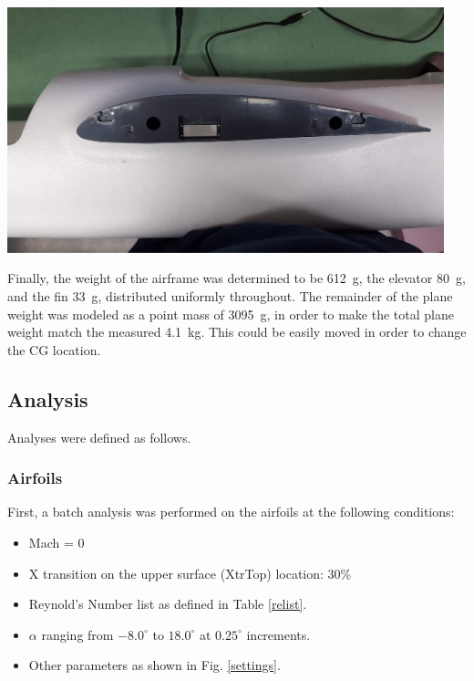 \documentclass[]{auvsi_doc}
\begin{document}
\begin{center}
	\includegraphics[width=0.95\textwidth]{./airfoils.png}
	\label{airfoil}
\end{center}

Finally, the weight of the airframe was determined to be 612~g, the elevator 80~g, and the fin 33~g, distributed uniformly throughout. The remainder of the plane weight was modeled as a point mass of 3095~g, in order to make the total plane weight match the measured 4.1~kg. This could be easily moved in order to change the CG location.

\subsection{Analysis}

Analyses were defined as follows.

\subsubsection{Airfoils}
First, a batch analysis was performed on the airfoils at the following conditions:
\begin{itemize}
	\item Mach = 0
	\item X transition on the upper surface (XtrTop) location: 30\%
	\item Reynold's Number list as defined in Table \ref{relist}.
	\item $\alpha$ ranging from $-8.0^\circ$ to $18.0^\circ$ at $0.25^\circ$ increments.
	\item Other parameters as shown in Fig. \ref{settings}.
\end{itemize}
\end{document}
